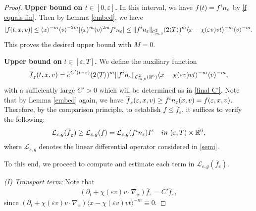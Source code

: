 \documentclass[10pt,a4paper]{amsart}
\begin{document}
\begin{proof}
\textbf{Upper bound on $t\in[0,\varepsilon]$.} In this interval, we have $f(t)=f^\textup{in}_\varepsilon$ by \eqref{f equals fin}. Then by Lemma \ref{embed}, we have 
\begin{align*}
|f(t,x,v)| \le \langle x\rangle^{-m} \langle v\rangle ^{-2m} |\langle x\rangle^m \langle v\rangle ^{2m} f^\textup{in}_\varepsilon|\le \lVert f^\textup{in}_\varepsilon\rVert_{\mathcal{C}^2_{m,0}}(2\langle T\rangle)^m\langle x-\chi(\varepsilon v)vt\rangle^{-m}\langle v\rangle^{-m}.
\end{align*}This proves the desired upper bound with $M=0$.


\noindent\textbf{Upper bound on }$t\in[\varepsilon,T]$\textbf{.} We define the auxiliary function
\begin{align*}
\overline{f}_\varepsilon(t,x,v) = e^{C'(t-\varepsilon)}(2\langle T\rangle)^m\lVert f^\textup{in}_\varepsilon\rVert_{\mathcal{C}^2_{m,0}(\mathbb{R}^6)} \langle x - \chi(\varepsilon v)vt\rangle^{-m}\langle v\rangle^{-m},
\end{align*}with a sufficiently large $C'>0$ which will be determined as in \eqref{final C'}. Note that by Lemma \ref{embed} again, we have $\overline{f}_\varepsilon(\varepsilon,x,v)\ge f^\textup{in}_\varepsilon(x,v)= f(\varepsilon, x,v)$. Therefore, by the comparison principle, to establish $f\le \overline{f}_\varepsilon$, it suffices to verify the following:
\begin{align}\label{4.2 desired ineq}
\mathcal{L}_{\varepsilon,g}(\overline{f}_\varepsilon) \ge \mathcal{L}_{\varepsilon,g}(f)=\mathcal{L}_{\varepsilon,g}(f^\textup{in}_\varepsilon)I^\varepsilon  \quad \textup{ in }\,\, (\varepsilon, T)\times\mathbb{R}^6,
\end{align}where $\mathcal{L}_{\varepsilon,g}$ denotes the linear differential operator considered in \eqref{semi}.

To this end, we proceed to compute and estimate each term in $\mathcal{L}_{\varepsilon,g}(\overline{f}_\varepsilon)$. 

\noindent \textit{(I) Transport term:} Note that
\begin{align}\label{Trans est}
(\partial_t + \chi(\varepsilon v)v\cdot\nabla_x)\overline{f}_\varepsilon = C'\overline{f}_\varepsilon,
\end{align}since $(\partial_t + \chi(\varepsilon v) v\cdot\nabla_x)\langle x-\chi(\varepsilon v)vt\rangle^{-m} \equiv 0$.


\end{proof}
\end{document}
